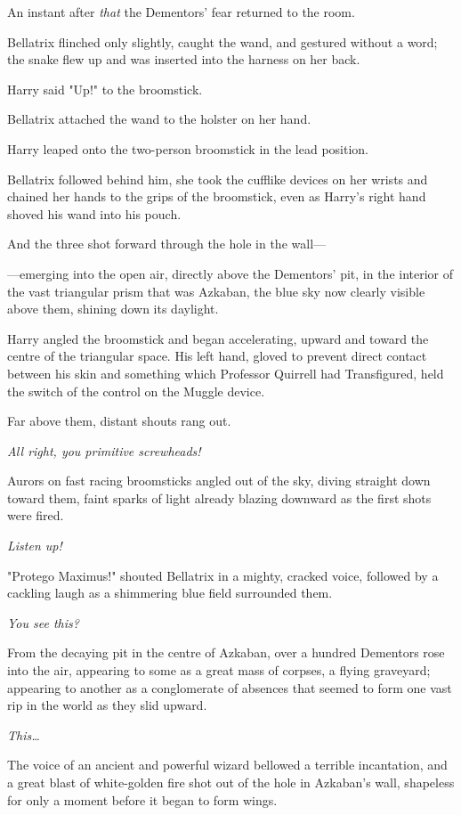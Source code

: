 An instant after \emph{that} the Dementors’ fear returned to the room.

Bellatrix flinched only slightly, caught the wand, and gestured without a word;
the snake flew up and was inserted into the harness on her back.

Harry said "Up!" to the broomstick.

Bellatrix attached the wand to the holster on her hand.

Harry leaped onto the two-person broomstick in the lead position.

Bellatrix followed behind him, she took the cufflike devices on her wrists and
chained her hands to the grips of the broomstick, even as Harry’s right hand
shoved his wand into his pouch.

And the three shot forward through the hole in the wall—

—emerging into the open air, directly above the Dementors’ pit, in the
interior of the vast triangular prism that was Azkaban, the blue sky now
clearly visible above them, shining down its daylight.

Harry angled the broomstick and began accelerating, upward and toward the
centre of the triangular space. His left hand, gloved to prevent direct contact
between his skin and something which Professor Quirrell had Transfigured, held
the switch of the control on the Muggle device.

Far above them, distant shouts rang out.

\emph{All right, you primitive screwheads!}

Aurors on fast racing broomsticks angled out of the sky, diving straight down
toward them, faint sparks of light already blazing downward as the first shots
were fired.

\emph{Listen up!}

"Protego Maximus!" shouted Bellatrix in a mighty, cracked voice, followed by a
cackling laugh as a shimmering blue field surrounded them.

\emph{You see this?}

From the decaying pit in the centre of Azkaban, over a hundred Dementors rose
into the air, appearing to some as a great mass of corpses, a flying graveyard;
appearing to another as a conglomerate of absences that seemed to form one vast
rip in the world as they slid upward.

\emph{This…}

The voice of an ancient and powerful wizard bellowed a terrible incantation,
and a great blast of white-golden fire shot out of the hole in Azkaban’s wall,
shapeless for only a moment before it began to form wings.

